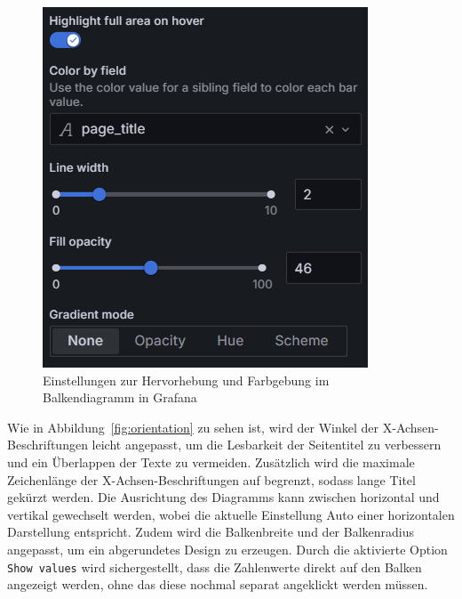 \begin{figure}[H]
\begin{minipage}{0.49\textwidth}
        \includegraphics[width=\linewidth, keepaspectratio]{images/highlight.png}
        \caption{Einstellungen zur Hervorhebung und Farbgebung im Balkendiagramm in Grafana}
        \label{fig:highlight}
    \end{minipage}
\end{figure}

Wie in Abbildung~\ref{fig:orientation} zu sehen ist, wird der Winkel der X-Achsen-Beschriftungen leicht angepasst, um die Lesbarkeit der Seitentitel zu verbessern und ein Überlappen der Texte zu vermeiden. Zusätzlich wird die maximale Zeichenlänge der X-Achsen-Beschriftungen auf \grqq{} begrenzt, sodass lange Titel gekürzt werden. Die Ausrichtung des Diagramms kann zwischen horizontal und vertikal gewechselt werden, wobei die aktuelle Einstellung \glqq Auto\grqq{} einer horizontalen Darstellung entspricht. Zudem wird die Balkenbreite und der Balkenradius angepasst, um ein abgerundetes Design zu erzeugen. Durch die aktivierte Option \texttt{Show values} wird sichergestellt, dass die Zahlenwerte direkt auf den Balken angezeigt werden, ohne das diese nochmal separat angeklickt werden müssen.

